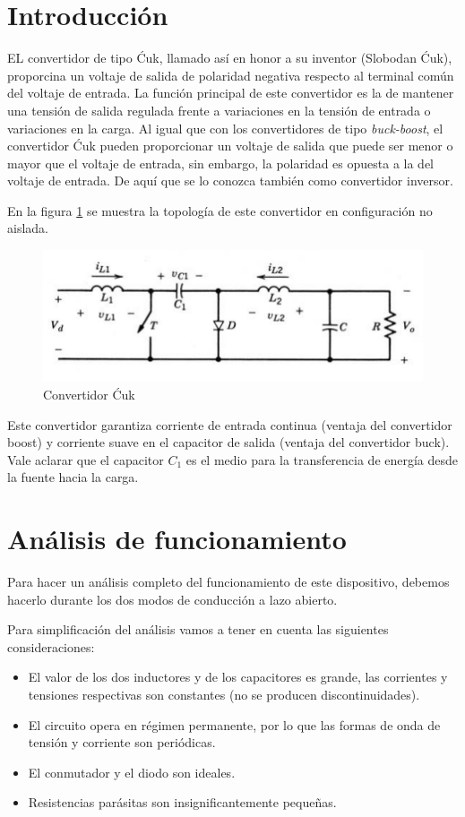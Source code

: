 \documentclass[conference]{IEEEtran}
\begin{document}
\section{Introducción}
\lettrine[lines=2]{E}{L} convertidor de tipo Ćuk, llamado así en honor a su inventor (Slobodan Ćuk), proporcina un voltaje de salida de polaridad negativa respecto al terminal común del voltaje de entrada. La función principal de este convertidor es la de mantener una tensión de salida regulada frente a variaciones en la tensión de entrada o variaciones en la carga. Al igual que con los convertidores de tipo \textit{buck-boost}, el convertidor Ćuk pueden proporcionar un voltaje de salida que puede ser menor o mayor que el voltaje de entrada, sin embargo, la polaridad es opuesta a la del voltaje de entrada. De aquí que se lo conozca también como convertidor inversor.

En la figura \ref{fig: convertidorĆuk} se muestra la topología de este convertidor en configuración no aislada.

\begin{figure}[h]
    \centerline{\includegraphics[scale=0.8]{imagenes/convertidor cuk.jpg}}
    \caption{Convertidor Ćuk}
    \label{fig: convertidorĆuk}
\end{figure}

Este convertidor garantiza corriente de entrada continua (ventaja del convertidor boost) y corriente suave en el capacitor de salida (ventaja del convertidor buck). Vale aclarar que el capacitor $C_1$ es el medio para la transferencia de energía desde la fuente hacia la carga.

\section{Análisis de funcionamiento}
Para hacer un análisis completo del funcionamiento de este dispositivo, debemos hacerlo durante los dos modos de conducción a lazo abierto.

Para simplificación del análisis vamos a tener en cuenta las siguientes consideraciones:
\begin{itemize}
    \item El valor de los dos inductores y de los capacitores es grande, las corrientes y tensiones respectivas son constantes (no se producen discontinuidades).
    \item El circuito opera en régimen permanente, por lo que las formas de onda de tensión y corriente son periódicas.
    \item El conmutador y el diodo son ideales.
    \item Resistencias parásitas son insignificantemente pequeñas.
\end{itemize}
\end{document}
